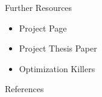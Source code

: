 \begin{frame}{Further Resources}
	\begin{itemize}
		\item Project Page~\cite{Reiser2017}
		\item Project Thesis Paper~\cite{Reiser2016}
		\item Optimization Killers~\cite{bluebird2017}
	\end{itemize}
\end{frame}

\begin{frame}[allowframebreaks]{References}
	\printbibliography[heading=none]
\end{frame}

